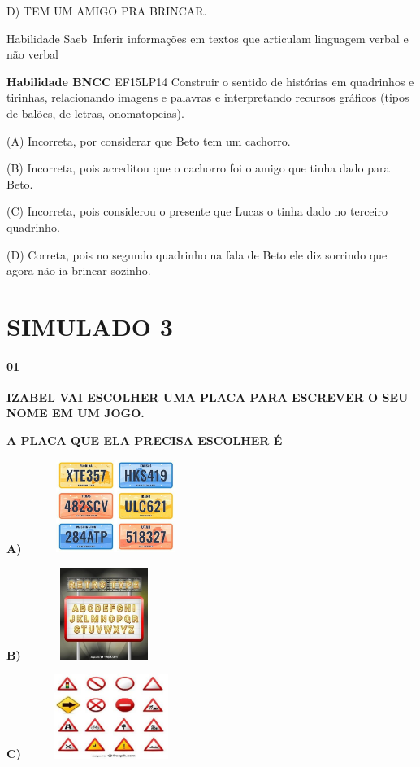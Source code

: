 \begin{escola}
D) TEM UM AMIGO PRA BRINCAR.

Habilidade Saeb~Inferir informações em textos que articulam linguagem
verbal e não verbal

\textbf{Habilidade BNCC} EF15LP14 Construir o sentido de histórias em
quadrinhos e tirinhas, relacionando imagens e palavras e interpretando
recursos gráficos (tipos de balões, de letras, onomatopeias).

(A) Incorreta, por considerar que Beto tem um cachorro.

(B) Incorreta, pois acreditou que o cachorro foi o amigo que tinha dado
para Beto.

(C) Incorreta, pois considerou o presente que Lucas o tinha dado no
terceiro quadrinho.

(D) Correta, pois no segundo quadrinho na fala de Beto ele diz sorrindo
que agora não ia brincar sozinho.


\chapter{SIMULADO 3}

\subsubsection{01}\label{section-57}

\textbf{IZABEL VAI ESCOLHER UMA PLACA PARA ESCREVER O SEU NOME EM UM
JOGO.}

\textbf{A PLACA QUE ELA PRECISA ESCOLHER É }

\textbf{A)}
\includegraphics[width=2.32569in,height=1.18472in]{media/image222.jpg}

\textbf{B)}
\includegraphics[width=2.03125in,height=1.17361in]{media/image223.jpg}

\textbf{C)}
\includegraphics[width=2.20764in,height=1.07569in]{media/image224.jpg}


\end{escola}
